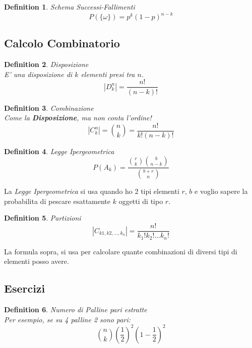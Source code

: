 \documentclass{article}
\newtheorem{definition}{Definition}[section]
\begin{document}
    \begin{definition} Schema Successi-Fallimenti
        $$
        P(\{\omega\}) = p^k (1-p)^{n-k }
        $$
    \end{definition}

    \subsection{Calcolo Combinatorio}
    \begin{definition} Disposizione \\
        E' una disposizione di $k$ elementi presi tra $n$.
        $$|D_k ^n| = \frac{n!}{(n-k)!}$$
    \end{definition}

    \begin{definition} Combinazione \\
        Come la \textbf{Disposizione}, ma non conta l'ordine!
        $$|C_k ^n| = \binom{n}{k} = \frac{n!}{k!(n-k)!}$$
    \end{definition}

    \begin{definition} Legge Ipergeometrica
        $$
        P(A_k) = \frac{\binom{r}{k} \binom{b}{n-k}}{\binom{b+r}{n}}
        $$
    \end{definition}

    La \textit{Legge Ipergeometrica} si usa quando ho 2 tipi elementi $r$, $b$ e voglio sapere 
    la probabilita di pescare esattamente $k$ oggetti di tipo $r$.
    \newpage

    \begin{definition} Partizioni \\
        $$ |C_{k1,k2,\dots,k_n}| = \frac{n!}{k_1!k_2! \dots k_n!} $$
    \end{definition}  

    La formula sopra, si usa per calcolare quante combinazioni di diversi tipi di elementi posso avere.

    \subsection{Esercizi}
    \begin{definition} Numero di Palline pari estratte \\
        Per esempio, se su 4 palline 2 sono pari:
        $$
            \binom{n}{k}(\frac{1}{2})^2 (1- \frac{1}{2})^2
        $$
    \end{definition}  
\end{document}
